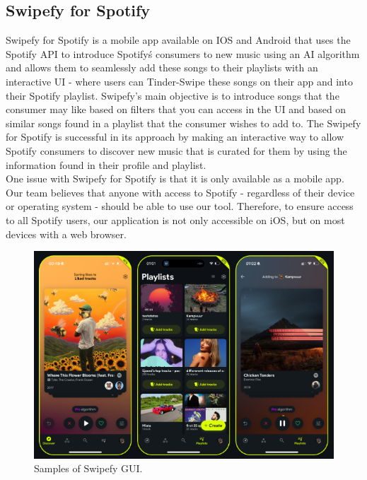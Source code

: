 \documentclass{article}
\begin{document}
\pagebreak

\subsection{Swipefy for Spotify}
\quad Swipefy for Spotify is a mobile app available on IOS and Android that uses the Spotify API to introduce Spotify\'s consumers to new music using an AI algorithm and allows them to seamlessly add these songs to their playlists with an interactive UI - where users can Tinder-Swipe these songs on their app and into their Spotify playlist. \cite{swipefy} Swipefy’s main objective is to introduce songs that the consumer may like based on filters that you can access in the UI and based on similar songs found in a playlist that the consumer wishes to add to. The Swipefy for Spotify is successful in its approach by making an interactive way to allow Spotify consumers to discover new music that is curated for them by using the information found in their profile and playlist. \\

One issue with Swipefy for Spotify is that it is only available as a mobile app. Our team believes that anyone with access to Spotify - regardless of their device or operating system - should be able to use our tool. Therefore, to ensure access to all Spotify users, our application is not only accessible on iOS, but on most devices with a web browser.

\begin{figure}[ht]
  \centering
  \includegraphics[width=5in]{./swipefyss.png}
  \caption{Samples of Swipefy GUI.}
  \label{fig:swipey}
\end{figure}
\end{document}
